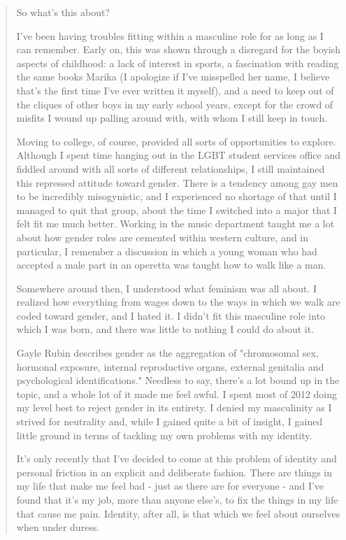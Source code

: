 \begin{paracol}{2}
\begin{leftcolumn}
\begin{quotation}
So what's this about?

I've been having troubles fitting within a masculine role for as long as I can remember.  Early on, this was shown through a disregard for the boyish aspects of childhood: a lack of interest in sports, a fascination with reading the same books Marika (I apologize if I've misspelled her name, I believe that's the first time I've ever written it myself), and a need to keep out of the cliques of other boys in my early school years, except for the crowd of misfits I wound up palling around with, with whom I still keep in touch.

Moving to college, of course, provided all sorts of opportunities to explore.  Although I spent time hanging out in the LGBT student services office and fiddled around with all sorts of different relationships, I still maintained this repressed attitude toward gender.  There is a tendency among gay men to be incredibly misogynistic, and I experienced no shortage of that until I managed to quit that group, about the time I switched into a major that I felt fit me much better.  Working in the music department taught me a lot about how gender roles are cemented within western culture, and in particular, I remember a discussion in which a young woman who had accepted a male part in an operetta was taught how to walk like a man.

Somewhere around then, I understood what feminism was all about.  I realized how everything from wages down to the ways in which we walk are coded toward gender, and I hated it.  I didn't fit this masculine role into which I was born, and there was little to nothing I could do about it.

Gayle Rubin describes gender as the aggregation of "chromosomal sex, hormonal exposure, internal reproductive organs, external genitalia and psychological identifications." Needless to say, there's a lot bound up in the topic, and a whole lot of it made me feel awful.  I spent most of 2012 doing my level best to reject gender in its entirety.  I denied my masculinity as I strived for neutrality and, while I gained quite a bit of insight, I gained little ground in terms of tackling my own problems with my identity.

It's only recently that I've decided to come at this problem of identity and personal friction in an explicit and deliberate fashion.  There are things in my life that make me feel bad - just as there are for everyone - and I've found that it's my job, more than anyone else's, to fix the things in my life that cause me pain.  Identity, after all, is that which we feel about ourselves when under duress.


\end{quotation}
\end{leftcolumn}
\end{paracol}

